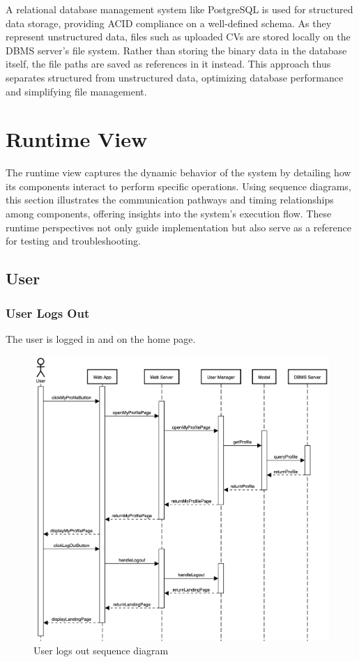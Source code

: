 A relational database management system like PostgreSQL is used for structured data storage, providing ACID compliance on a well-defined schema.
As they represent unstructured data, files such as uploaded CVs are stored locally on the DBMS server’s file system.
Rather than storing the binary data in the database itself, the file paths are saved as references in it instead.
This approach thus separates structured from unstructured data, optimizing database performance and simplifying file management.

\section{Runtime View}
The runtime view captures the dynamic behavior of the system by detailing how its components interact to perform specific operations.
Using sequence diagrams, this section illustrates the communication pathways and timing relationships among components, offering insights into the system's execution flow.
These runtime perspectives not only guide implementation but also serve as a reference for testing and troubleshooting.

\clearpage
\subsection{User}
\subsubsection{User Logs Out}
The user is logged in and on the home page.

\begin{figure}[h]
    \centering
    \includegraphics[width=16cm]{images/sequence-diagrams/user-logs-out.png}
    \caption{User logs out sequence diagram}
\end{figure}

